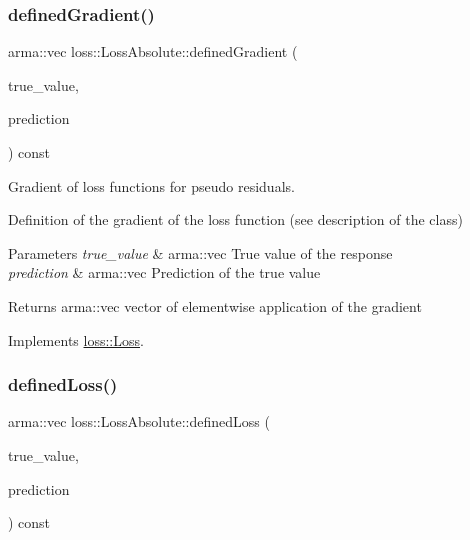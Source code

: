 \mbox{\label{classloss_1_1_loss_absolute_a89e530450e42f20fc060ed9141fa8c04}} 
\subsubsection{\texorpdfstring{defined\+Gradient()}{definedGradient()}}
{\footnotesize\ttfamily arma\+::vec loss\+::\+Loss\+Absolute\+::defined\+Gradient (\begin{DoxyParamCaption}\item[{const arma\+::vec \&}]{true\+\_\+value,  }\item[{const arma\+::vec \&}]{prediction }\end{DoxyParamCaption}) const\hspace{0.3cm}{\ttfamily [virtual]}}



Gradient of loss functions for pseudo residuals. 

Definition of the gradient of the loss function (see description of the class)


\begin{DoxyParams}{Parameters}
{\em true\+\_\+value} & {\ttfamily arma\+::vec} True value of the response \\
\hline
{\em prediction} & {\ttfamily arma\+::vec} Prediction of the true value\\
\hline
\end{DoxyParams}
\begin{DoxyReturn}{Returns}
{\ttfamily arma\+::vec} vector of elementwise application of the gradient 
\end{DoxyReturn}


Implements \mbox{\hyperlink{classloss_1_1_loss_a267a4de70747ade4b2d84ce35a448979}{loss\+::\+Loss}}.

\mbox{\label{classloss_1_1_loss_absolute_af10b320d7253ef4f566530717441059e}} 
\subsubsection{\texorpdfstring{defined\+Loss()}{definedLoss()}}
{\footnotesize\ttfamily arma\+::vec loss\+::\+Loss\+Absolute\+::defined\+Loss (\begin{DoxyParamCaption}\item[{const arma\+::vec \&}]{true\+\_\+value,  }\item[{const arma\+::vec \&}]{prediction }\end{DoxyParamCaption}) const\hspace{0.3cm}{\ttfamily [virtual]}}



